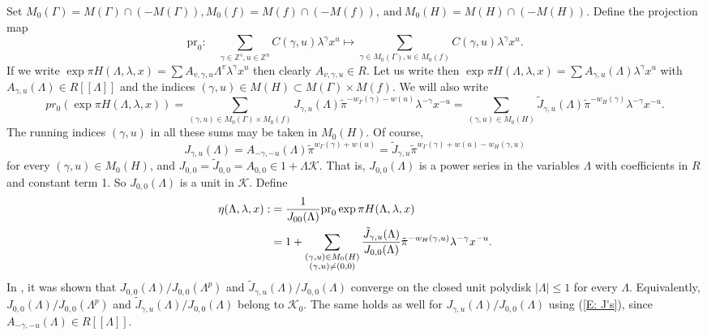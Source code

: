 \documentclass{article}
\theoremstyle{remark}
\def\bb #1{ {\mathbb #1} }
\def\c #1{ {\mathcal #1} }
\begin{document}
\bigskip{} Set $M_0(\Gamma) = M(\Gamma) \cap (- M(\Gamma)), M_0(f) = M(f) \cap (- M(f)), \ \text{and} \ M_0(H) = M(H) \cap (-M(H))$. Define the projection map 
\[
\text{pr}_0: \quad  \sum_{\gamma \in \bb Z^s, u \in \bb Z^n} C(\gamma, u) \lambda^\gamma x^u \longmapsto \sum_{\gamma \in M_0(\Gamma), u \in M_0(f)} C(\gamma, u) \lambda^\gamma x^u.
\]
If we write $\exp \pi H(\Lambda, \lambda, x) = \sum A_{v, \gamma, u} \Lambda^v \lambda^\gamma x^u$ then clearly $A_{v, \gamma, u} \in R$. Let us write then $\exp \pi H(\Lambda, \lambda, x) = \sum A_{\gamma, u}(\Lambda) \lambda^\gamma x^u$ with $A_{\gamma, u}(\Lambda) \in R[[\Lambda]]$ and the indices $(\gamma, u) \in M(H) \subset M(\Gamma) \times M(f)$. We will also write 
\[
pr_0( \exp \pi H(\Lambda, \lambda, x) ) = \sum_{(\gamma, u) \in M_0(\Gamma) \times M_0(f)} J_{\gamma, u}(\Lambda) \tilde \pi^{-w_\Gamma(\gamma) -w(u)} \lambda^{-\gamma} x^{-u} =  \sum_{(\gamma, u) \in M_0(H)} \tilde{J}_{\gamma, u}(\Lambda) \tilde \pi^{-w_H(\gamma)} \lambda^{-\gamma} x^{-u}.
\]
The running indices $(\gamma, u)$ in all these sums may be taken in $M_0(H).$ Of course, 
\begin{equation}\label{E: J's}
J_{\gamma, u}(\Lambda) = A_{-\gamma, -u}(\Lambda) \tilde \pi^{w_\Gamma(\gamma) + w(u)} = \tilde{J}_{\gamma,u} \tilde{\pi}^{ w_{\Gamma}(\gamma)+w(u) -w_H(\gamma,u) }
\end{equation}
for every $(\gamma, u) \in M_0(H)$, and $J_{0,0} = \tilde{J}_{0,0} = A_{0,0}  \in 1 + \Lambda \c K$.  That is, $J_{0,0}(\Lambda)$ is a power series in the variables $ \Lambda$ with coefficients in $R$ and constant term 1. So $J_{0,0}(\Lambda)$ is a unit in $\c K$. Define 
\begin{align}\label{E: eigenvector}
\eta(\Lambda, \lambda, x) :&= \frac{1}{ J_{00}(\Lambda) } \text{pr}_0 \exp \pi H(\Lambda, \lambda, x) \notag \\
&= 1 + \sum_{\substack{ (\gamma, u) \in M_0(H)  \\  (\gamma, u) \not= (0,0)}} \frac{\tilde{J}_{\gamma, u}(\Lambda)}{J_{0,0}(\Lambda)} \tilde \pi^{-w_H(\gamma,u)} \lambda^{-\gamma} x^{-u}. 
\end{align}
In \cite{MR2966711}, it was shown that $J_{0,0}(\Lambda) / J_{0,0}(\Lambda^p)$ and $\tilde{J}_{\gamma, u}(\Lambda) / J_{0,0}(\Lambda)$ converge on the closed unit polydisk $| \Lambda | \leq 1$ for every $\Lambda$. Equivalently, $J_{0,0}(\Lambda) / J_{0,0}(\Lambda^p)$ and $ \tilde{J}_{\gamma, u}(\Lambda) / J_{0,0}(\Lambda)$ belong to $\c K_0$. The same holds as well for $ J_{\gamma, u}(\Lambda) / J_{0,0}(\Lambda)$ using (\ref{E: J's}), since $A_{-\gamma,-u}(\Lambda) \in R[[\Lambda]]$.
\end{document}
